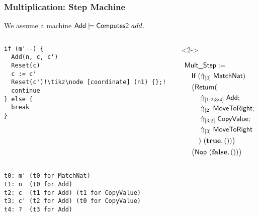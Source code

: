 \documentclass{beamer} %
\renewcommand{\VDash}{\vDash}
\renewcommand{\Vector}[1]{\left[{#1}\right]}
\begin{document}
\begin{frame}
  \frametitle{Multiplication: Step Machine}
  \footnotesize
  
  We assume a machine $\MS{Add} \VDash \MS{Computes2}~add$.

  \begin{columns}
    \begin{column}{0.4\textwidth}
\begin{lstlisting}[escapechar=!]
if (m'--) {
  Add(n, c, c')
  Reset(c)
  c := c'
  Reset(c')!\tikz\node [coordinate] (n1) {};!
  continue
} else {
  break
}
\end{lstlisting}

    \end{column}

    \begin{column}{0.6\textwidth}
      \begin{overlayarea}{\textwidth}{5cm}
        \begin{onlyenv}<2->

          
          \begin{align*}
            & \MS{Mult\_Step} := \\
            & \quad\MS{If}~(\Uparrow_{\Vector{0}} \MS{MatchNat}) \\
            & \quad\bigl(\MS{Return}( \bigr. \\
            & \quad\quad \Uparrow_{\Vector{1; 2; 3; 4}}\MS{Add}; \\
            & \quad\quad \Uparrow_{\Vector{2}} \MS{MoveToRight}; \\
            & \quad\quad \Uparrow_{\Vector{3;2}} \MS{CopyValue}; \\
            & \quad\quad \Uparrow_{\Vector{3}} \MS{MoveToRight} \\
            & \quad\quad\bigl. )~(\true, \unit) \bigr) \\
            & \quad\bigl(\MS{Nop}~(\false, \unit)\bigr)
          \end{align*}
        \end{onlyenv}
      \end{overlayarea}
    \end{column}
    
  \end{columns}

\begin{lstlisting}
t0: m' (t0 for MatchNat)
t1: n  (t0 for Add)
t2: c  (t1 for Add) (t1 for CopyValue)
t3: c' (t2 for Add) (t0 for CopyValue)
t4: ?  (t3 for Add)
\end{lstlisting}

\end{frame}
\end{document}
